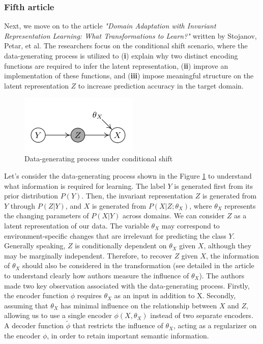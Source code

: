 \subsubsection{Fifth article}
 Next, we move on to the article \textit{"Domain Adaptation with Invariant Representation Learning: What Transformations to Learn?"} written by Stojanov, Petar, et al. \cite{stojanov2021domain} The researchers focus on the conditional shift scenario, where the data-generating process is utilized to (\textbf{i}) explain why two distinct encoding functions are required to infer the latent representation, (\textbf{ii}) improve an implementation of these functions, and (\textbf{iii}) impose meaningful structure on the latent representation $Z$ to increase prediction accuracy in the target domain.

\begin{figure}[H]
    \centering
    \includegraphics[width=0.5\textwidth]{Figures/From articles/DA_transforms.png}
    \caption{Data-generating process under conditional shift}
    \label{fig: DA_transf}
\end{figure}

Let's consider the data-generating process shown in the Figure \ref{fig: DA_transf} to understand what information is required for learning. The label $Y$ is generated first from its prior distribution $P(Y)$. Then, the invariant representation $Z$ is generated from $Y$ through $P(Z|Y)$, and $X$ is generated from $P(X|Z; \theta_X)$, where $\theta_X$ represents the changing parameters of $P(X|Y)$ across domains. We can consider $Z$ as a latent representation of our data. The variable $\theta_X$ may correspond to environment-specific changes that are irrelevant for predicting the class $Y$. Generally speaking, $Z$ is conditionally dependent on $\theta_X$ given $X$, although they may be marginally independent. Therefore, to recover $Z$ given $X$, the information of $\theta_X$ should also be considered in the transformation (see detailed in the article to understand clearly how authors measure the influence of $\theta_X$). The authors made two key observation associated with the data-generating process. Firstly, the encoder function $\phi$ requires $\theta_X$ as an input in addition to X. Secondly, assuming that $\theta_X$ has minimal influence on the relationship between $X$ and $Z$, allowing us to use a single encoder $\phi(X, \theta_X)$ instead of two separate encoders. A decoder function $\widetilde{\phi}$ that restricts the influence of $\theta_X$, acting as a regularizer on the encoder $\phi$, in order to retain important semantic information.

